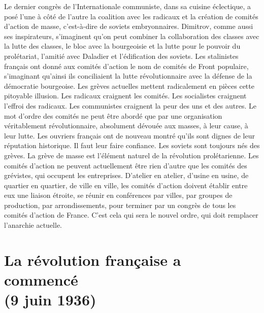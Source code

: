 \documentclass[french,twoside]{book} %
\begin{document}
Le dernier congrès de l’Internationale communiste, dans sa cuisine éclectique, a posé l’une à côté de l’autre la coalition avec les radicaux et la création de comités d’action de masse, c’est-à-dire de soviets embryonnaires. Dimitrov, comme aussi ses inspirateurs, s’imaginent qu’on peut combiner la collaboration des classes avec la lutte des classes, le bloc avec la bourgeoisie et la lutte pour le pouvoir du prolétariat, l’amitié avec Daladier et l’édification des soviets. Les stalinistes français ont donné aux comités d’action le nom de comités de Front populaire, s’imaginant qu’ainsi ils conciliaient la lutte révolutionnaire avec la défense de la démocratie bourgeoise. Les grèves actuelles mettent radicalement en pièces cette pitoyable illusion. Les radicaux craignent les comités. Les socialistes craignent l’effroi des radicaux. Les communistes craignent la peur des uns et des autres. Le mot d’ordre des comités ne peut être abordé que par une organisation véritablement révolutionnaire, absolument dévouée aux masses, à leur cause, à leur lutte. Les ouvriers français ont de nouveau montré qu’ils sont dignes de leur réputation historique. Il faut leur faire confiance. Les soviets sont toujours nés des grèves. La grève de masse est l’élément naturel de la révolution prolétarienne. Les comités d’action ne peuvent actuellement être rien d’autre que les comités des grévistes, qui occupent les entreprises. D’atelier en atelier, d’usine en usine, de quartier en quartier, de ville en ville, les comités d’action doivent établir entre eux une liaison étroite, se réunir en conférences par villes, par groupes de production, par arrondissements, pour terminer par un congrès de tous les comités d’action de France. C’est cela qui sera le nouvel ordre, qui doit remplacer l’anarchie actuelle.
 \section[{La révolution française a commencé, (9 juin 1936)}]{La révolution française a commencé \\
(9 juin 1936)}
\label{p7}\renewcommand{\leftmark}{La révolution française a commencé \\
(9 juin 1936)}
\end{document}
